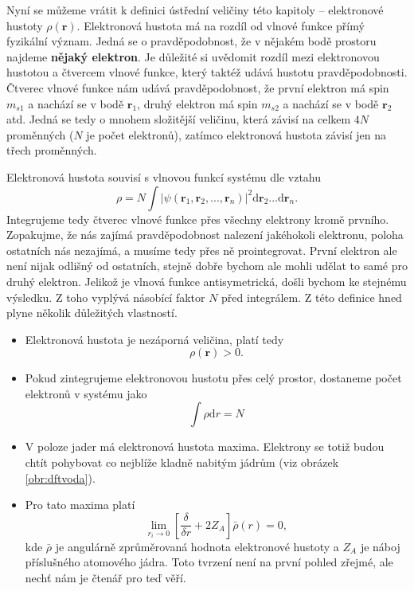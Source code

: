 Nyní se můžeme vrátit k definici ústřední veličiny této kapitoly -- elektronové hustoty $\rho(\mathbf{r})$.
Elektronová hustota má na rozdíl od vlnové funkce přímý fyzikální význam. Jedná se o pravděpodobnost, že v nějakém bodě prostoru najdeme \textbf{nějaký elektron}. Je důležité si uvědomit rozdíl mezi elektronovou hustotou a čtvercem vlnové funkce, který taktéž udává hustotu pravděpodobnosti. Čtverec vlnové funkce nám udává pravděpodobnost, že první elektron má spin $m_{s1}$ a nachází se v bodě $\mathbf{r}_1$, druhý elektron má spin $m_{s2}$ a nachází se v bodě $\mathbf{r}_2$ atd. Jedná se tedy o mnohem složitější veličinu, která závisí na celkem $4N$ proměnných ($N$ je počet elektronů), zatímco elektronová hustota závisí jen na třech proměnných.

Elektronová hustota souvisí s vlnovou funkcí systému dle vztahu
\begin{equation}
\rho=N \int |\psi(\textbf{r}_1,\textbf{r}_2,...,\textbf{r}_n)|^2 \mathrm{d}\textbf{r}_2\dots\mathrm{d}\textbf{r}_n .
\label{rov:dft:defrho}
\end{equation}
Integrujeme tedy čtverec vlnové funkce přes všechny elektrony kromě prvního. Zopakujme, že nás zajímá pravděpodobnost nalezení jakéhokoli elektronu, poloha ostatních nás nezajímá, a musíme tedy přes ně prointegrovat. První elektron ale není nijak odlišný od ostatních, stejně dobře bychom ale mohli udělat to samé pro druhý elektron. Jelikož je vlnová funkce antisymetrická, došli bychom ke stejnému výsledku. Z toho vyplývá násobící faktor $N$ před integrálem.
Z této definice hned plyne několik důležitých vlastností.

\begin{itemize}
\item Elektronová hustota je nezáporná veličina, platí tedy
\begin{equation}
\rho(\mathbf{r})  > 0 .
\end{equation}
\item Pokud zintegrujeme elektronovou hustotu přes celý prostor, dostaneme počet elektronů v systému jako
\begin{equation}
\int \rho\mathrm{d}r = N
\end{equation}

\item V poloze jader má elektronová hustota maxima. Elektrony se totiž budou chtít pohybovat co nejblíže kladně nabitým jádrům (viz obrázek \ref{obr:dftvoda}). 

\item Pro tato maxima platí
\begin{equation}
\lim_{r_i \to 0} \left[ \frac{\delta}{\delta r}+2Z_A\right]\bar{\rho}(r)=0, 
\end{equation}
kde $\bar{\rho}$ je angulárně zprůměrovaná hodnota elektronové hustoty a $Z_A$ je náboj příslušného atomového jádra. Toto tvrzení není na první pohled zřejmé, ale nechť nám je čtenář pro teď věří.
\end{itemize}

